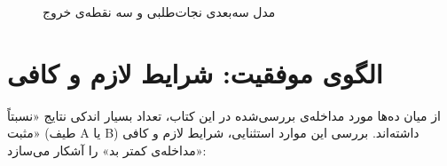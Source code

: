 \begin{figure}[htbp]
\caption{مدل سه‌بعدی نجات‌طلبی و سه نقطه‌ی خروج}
\label{fig:ch14-3d-model}
\end{figure}


\section{الگوی موفقیت: شرایط لازم و کافی}
\label{sec:ch14-success-pattern}

از میان ده‌ها مورد مداخله‌ی بررسی‌شده در این کتاب، تعداد بسیار اندکی نتایج «نسبتاً مثبت» (طیف A یا B) داشته‌اند. بررسی این موارد استثنایی، شرایط لازم و کافی «مداخله‌ی کمتر بد» را آشکار می‌سازد:

